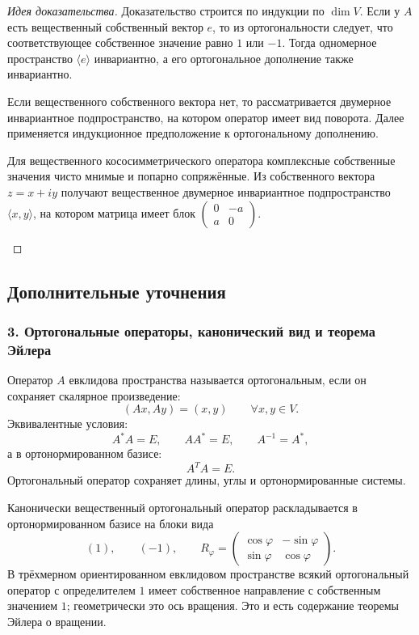 \documentclass[12pt,a4paper]{article}
\theoremstyle{definition}
\theoremstyle{plain}
\theoremstyle{remark}
\newenvironment{knowledgefix}{\begin{clarifybox}}{\end{clarifybox}}
\begin{document}
\begin{proof}[Идея доказательства]
Доказательство строится по индукции по $\dim V$.
Если у $A$ есть вещественный собственный вектор $e$, то из ортогональности следует, что соответствующее собственное значение равно $1$ или $-1$.
Тогда одномерное пространство $\langle e\rangle$ инвариантно, а его ортогональное дополнение также инвариантно.

Если вещественного собственного вектора нет, то рассматривается двумерное инвариантное подпространство, на котором оператор имеет вид поворота.
Далее применяется индукционное предположение к ортогональному дополнению.
\begin{knowledgefix}
Для вещественного кососимметрического оператора комплексные собственные значения чисто мнимые и попарно сопряжённые. Из собственного вектора \(z=x+iy\) получают вещественное двумерное инвариантное подпространство \(\langle x,y\rangle\), на котором матрица имеет блок \(\begin{pmatrix}0&-a\\a&0\end{pmatrix}\).
\end{knowledgefix}
\end{proof}

\subsection*{Дополнительные уточнения}

\subsubsection*{3. Ортогональные операторы, канонический вид и теорема Эйлера}
Оператор $A$ евклидова пространства называется ортогональным, если он сохраняет скалярное произведение:
\[
    (Ax,Ay)=(x,y)\qquad \forall x,y\in V.
\]
Эквивалентные условия:
\[
    A^*A=E,
    \qquad
    AA^*=E,
    \qquad
    A^{-1}=A^*,
\]
а в ортонормированном базисе:
\[
    A^TA=E.
\]
Ортогональный оператор сохраняет длины, углы и ортонормированные системы.

Канонически вещественный ортогональный оператор раскладывается в ортонормированном базисе на блоки вида
\[
    (1),\qquad (-1),\qquad
    R_\varphi=\begin{pmatrix}
        \cos\varphi & -\sin\varphi\\
        \sin\varphi & \cos\varphi
    \end{pmatrix}.
\]
В трёхмерном ориентированном евклидовом пространстве всякий ортогональный оператор с определителем $1$ имеет собственное направление с собственным значением $1$; геометрически это ось вращения. Это и есть содержание теоремы Эйлера о вращении.
\end{document}
